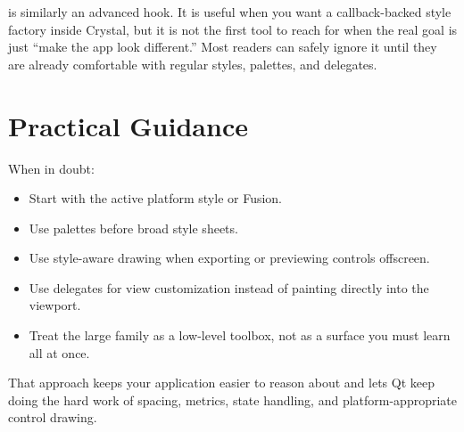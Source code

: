  is similarly an advanced hook. It is useful when you want a callback-backed style factory inside Crystal, but it is not the first tool to reach for when the real goal is just ``make the app look different.'' Most readers can safely ignore it until they are already comfortable with regular styles, palettes, and delegates.

\section{Practical Guidance}

When in doubt:

\begin{itemize}
  \item Start with the active platform style or Fusion.
  \item Use palettes before broad style sheets.
  \item Use style-aware drawing when exporting or previewing controls offscreen.
  \item Use delegates for view customization instead of painting directly into the viewport.
  \item Treat the large  family as a low-level toolbox, not as a surface you must learn all at once.
\end{itemize}

That approach keeps your application easier to reason about and lets Qt keep doing the hard work of spacing, metrics, state handling, and platform-appropriate control drawing.
